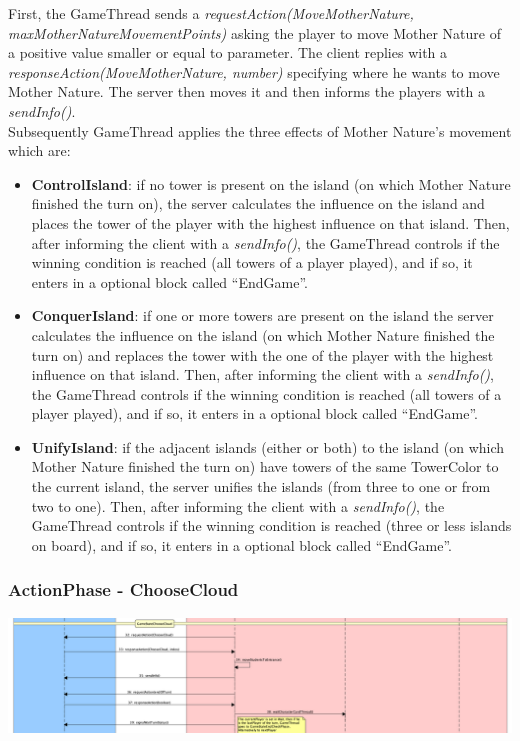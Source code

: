 \documentclass[12pt]{article}
\begin{document}
				First, the GameThread sends a \emph{requestAction(MoveMotherNature, maxMotherNatureMovementPoints)} asking the player to move Mother Nature of a positive value smaller or equal to parameter. The client replies with a \emph{responseAction(MoveMotherNature, number)} specifying where he wants to move Mother Nature. The server then moves it and then informs the players with a \emph{sendInfo()}. \\
				Subsequently GameThread applies the three effects of Mother Nature's movement which are:
				\begin{itemize}
					\item \textbf{ControlIsland}: if no tower is present on the island (on which Mother Nature finished the turn on), the server calculates the influence on the island and places the tower of the player with the highest influence on that island. Then, after informing the client with a \emph{sendInfo()}, the GameThread controls if the winning condition is reached (all towers of a player played), and if so, it enters in a optional block called ``EndGame''.
					\item \textbf{ConquerIsland}: if one or more towers are present on the island the server calculates the influence on the island (on which Mother Nature finished the turn on) and replaces the tower with the one of the player with the highest influence on that island. Then, after informing the client with a \emph{sendInfo()}, the GameThread controls if the winning condition is reached (all towers of a player played), and if so, it enters in a optional block called ``EndGame''.
					\item \textbf{UnifyIsland}: if the adjacent islands (either or both) to the island (on which Mother Nature finished the turn on) have towers of the same TowerColor to the current island, the server unifies the islands (from three to one or from two to one). Then, after informing the client with a \emph{sendInfo()}, the GameThread controls if the winning condition is reached (three or less islands on board), and if so, it enters in a optional block called ``EndGame''. 
				\end{itemize}
				
			\subsubsection{ActionPhase - ChooseCloud}
			
				\begin{center}
					\includegraphics[width=\textwidth,height=\textheight,keepaspectratio]{Game_4}
				\end{center}
				
\end{document}
